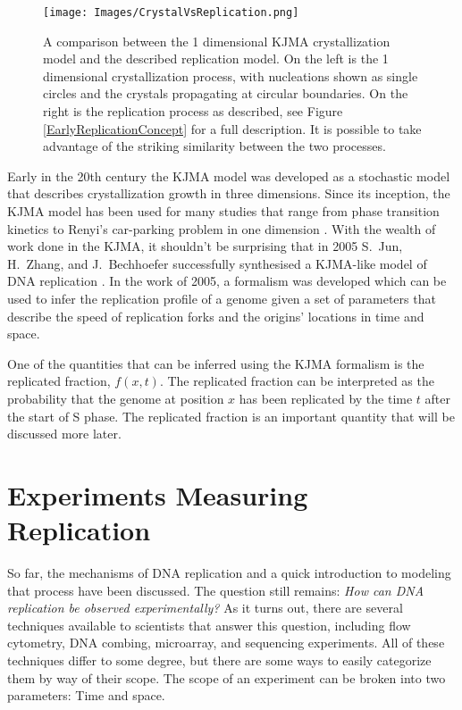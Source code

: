 	\begin{figure}[tbh]
		\begin{center}
			\texttt{[image: Images/CrystalVsReplication.png]}
		\end{center}
			\caption[Comparing Crystallization with Replication]{\label{CrystalVsReplication} A comparison between the 1 dimensional KJMA crystallization model and the described replication model.
				On the left is the 1 dimensional crystallization process, with nucleations shown as single circles and the crystals propagating at circular boundaries.
				On the right is the replication process as described, see Figure \ref{EarlyReplicationConcept} for a full description.
				It is possible to take advantage of the striking similarity between the two processes.}
	\end{figure}
	
	Early in the 20th century the KJMA model was developed as a stochastic model that describes crystallization growth in three dimensions.
	Since its inception, the KJMA model has been used for many studies that range from phase transition kinetics \cite{AlloyPhaseTransitions} to Renyi's car-parking problem in one dimension \cite{CarParking}.
	With the wealth of work done in the KJMA, it shouldn't be surprising that in 2005 S.~Jun, H.~Zhang, and J.~Bechhoefer successfully synthesised a KJMA-like model of DNA replication \cite{KJMA1,KJMA2}.
	In the work of 2005, a formalism was developed which can be used to infer the replication profile of a genome given a set of parameters that describe the speed of replication forks and the origins' locations in time and space.
	
	One of the quantities that can be inferred using the KJMA formalism is the replicated fraction, $f(x,t)$.
	The replicated fraction can be interpreted as the probability that the genome at position $x$ has been replicated by the time $t$ after the start of S phase.
	The replicated fraction is an important quantity that will be discussed more later.
	
	
	\section{Experiments Measuring Replication}
	
	So far, the mechanisms of DNA replication and a quick introduction to modeling that process have been discussed.
	The question still remains:
	\emph{How can DNA replication be observed experimentally?}
	As it turns out, there are several techniques available to scientists that answer this question, including flow cytometry\cite{DeepSeq}, DNA combing\cite{DNACombing}, microarray\cite{McCuneMicroArray}, and sequencing experiments\cite{DeepSeq}.
	All of these techniques differ to some degree, but there are some ways to easily categorize them by way of their scope.
	The scope of an experiment can be broken into two parameters: Time and space.
	

